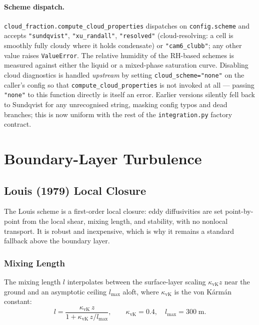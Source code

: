 \documentclass[11pt,twoside]{report}
\begin{document}
\paragraph{Scheme dispatch.}
\texttt{cloud\_fraction.compute\_cloud\_properties} dispatches on
\texttt{config.scheme} and accepts \texttt{"sundqvist"},
\texttt{"xu\_randall"}, \texttt{"resolved"} (cloud-resolving: a cell is
smoothly fully cloudy where it holds condensate) or \texttt{"cam6\_clubb"};
any other value raises \texttt{ValueError}.  The relative humidity of the
RH-based schemes is measured against either the liquid or a mixed-phase
saturation curve.
Disabling cloud diagnostics is handled \emph{upstream} by setting
\texttt{cloud\_scheme="none"} on the caller's config so that
\texttt{compute\_cloud\_properties} is not invoked at all --- passing
\texttt{"none"} to this function directly is itself an error.  Earlier
versions silently fell back to Sundqvist for any unrecognised string,
masking config typos and dead branches; this is now uniform with the
rest of the \texttt{integration.py} factory contract.


\section{Boundary-Layer Turbulence}
\label{sec:pbl}

\subsection{Louis (1979) Local Closure}

The Louis scheme \citep{Louis1979} is a first-order local closure: eddy
diffusivities are set point-by-point from the local shear, mixing length, and
stability, with no nonlocal transport. It is robust and inexpensive, which is
why it remains a standard fallback above the boundary layer.

\subsubsection{Mixing Length}

The mixing length $l$ interpolates between the surface-layer scaling
$\kappa_{\mathrm{vK}}z$ near the ground and an asymptotic ceiling $l_{\max}$
aloft, where $\kappa_{\mathrm{vK}}$ is the von K\'arm\'an constant:
\begin{equation}
  l = \frac{\kappa_{\mathrm{vK}}\,z}{1+\kappa_{\mathrm{vK}}\,z/l_{\max}},
  \qquad \kappa_{\mathrm{vK}}=0.4,\quad l_{\max}=300\;\text{m}.
\end{equation}
\end{document}
